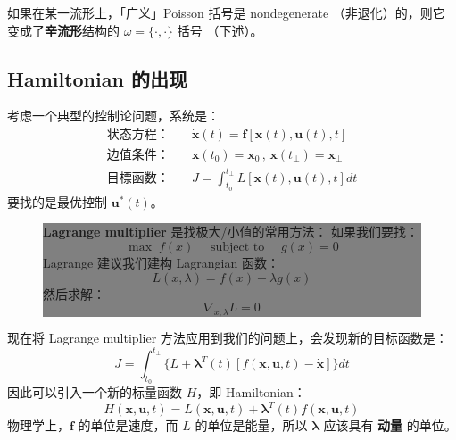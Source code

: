 \documentclass[orivec]{llncs}
\newcommand{\emp}[1]{\textbf{\textcolor{Cerulean}{#1}}}
\newcommand{\vect}[1]{\boldsymbol{#1}}
\begin{document}
如果在某一流形上，「广义」Poisson 括号是 nondegenerate （非退化）的，则它变成了\emp{辛流形}结构的 $\omega = \{ \cdot, \cdot \}$ 括号 （下述）。

\subsection{Hamiltonian 的出现}

考虑一个典型的控制论问题，系统是：
\begin{eqnarray}
\mbox{状态方程：} \quad & \dot{\vect{x}}(t) = \vect{f}[\vect{x}(t), \vect{u}(t), t] \\
\mbox{边值条件：} \quad & \vect{x}(t_0) = \vect{x}_0 \,,\, \vect{x}(t_\bot) = \vect{x}_\bot \\
\mbox{目標函数：} \quad & J = \int_{t_0}^{t_\bot} L[\vect{x}(t), \vect{u}(t), t] dt
\end{eqnarray}
要找的是最优控制 $\vect{u}^*(t)$。

\begin{figure}[H]
\begin{center}
\colorbox{grey}{\parbox{0.95\textwidth}{\setlength{\parskip}{2.5ex}

\emp{Lagrange multiplier} 是找极大/小值的常用方法： 如果我们要找：
\begin{equation}
\max \; f(x) \quad \mbox{ subject to } \quad g(x) = 0
\end{equation}
Lagrange 建议我们建构 Lagrangian 函数：
\begin{equation}
L(x, \lambda) = f(x) - \lambda g(x)
\end{equation}
然后求解：
\begin{equation}
\nabla_{x,\lambda} L = 0
\end{equation}
}}
\end{center}
\end{figure}

现在将 Lagrange multiplier 方法应用到我们的问题上，会发现新的目标函数是：
\begin{equation}
J = \int_{t_0}^{t_\bot} \{ L + \vect{\lambda}^T(t) \left[ f(\vect{x}, \vect{u}, t) - \dot{\vect{x}} \right] \} dt
\end{equation}
因此可以引入一个新的标量函数 $H$，即 Hamiltonian：
\begin{equation}
H(\vect{x}, \vect{u}, t) = L(\vect{x}, \vect{u}, t) + \vect{\lambda}^T(t) f(\vect{x}, \vect{u}, t)
\end{equation}
物理学上，$\vect{f}$ 的单位是速度，而 $L$ 的单位是能量，所以 $\vect{\lambda}$ 应该具有 \emp{动量} 的单位。
\end{document}
